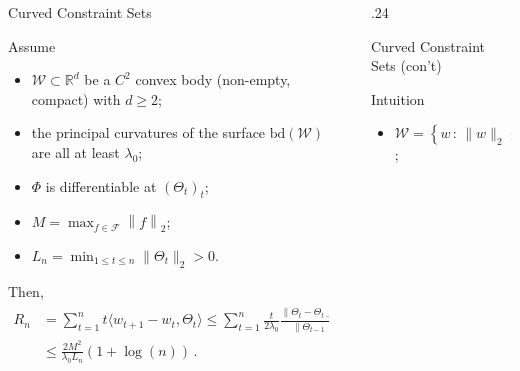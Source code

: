 \documentclass[final]{beamer} %
\newcommand{\cW}{\mathcal{W}}
\newcommand{\cF}{\mathcal{F}}
\newcommand{\bd}{\mathrm{bd}}
\newcommand{\R}{\mathbb{R}}
\newcommand{\norm}[1]{\left\| #1 \right\|}
\newcommand{\ip}[1]{\langle#1\rangle}
\newcommand{\set}[2]{\left\{#1 \,:\, #2 \right\}}
\begin{document}
\begin{frame}[c]
\begin{columns}[t,totalwidth=\textwidth]
\begin{column}{.24\textwidth}
\begin{block}{Curved Constraint Sets}
			\medskip
			\begin{tcolorbox}[title = \vspace{0.4cm}\textbf{\large Result I (Upper Bound)} \vspace{0.4cm}, title filled, width = 0.9\textwidth, colback = uofagreen!10, colframe = red, arc = 16pt]
				Assume
				\begin{itemize}
					\item $\cW\subset \R^d$ be a $C^2$ convex body (non-empty, compact) with $d \ge 2$;
					\item the principal curvatures of the surface $\bd(\cW)$ are all at least $\lambda_0$;
					\item $\Phi$ is differentiable at $(\Theta_t)_{t}$;
					\item $M = \max_{f\in \cF} \norm{f}_2$;
					\item  $L_n=\min_{1\le t \le n} \|\Theta_t\|_2 >0$. 
				\end{itemize}
					Then,
					\begin{align*}
					R_n & = \sum_{t=1}^{n} t\ip{ w_{t+1}-w_t,\Theta_t} %
					\le \sum_{t=1}^{n} \frac{t}{2\lambda_0} \frac{\|\Theta_t - \Theta_{t-1}\|_2^2}{\|\Theta_{t-1}\|_2} \\
					& \le \frac{2M^2}{\lambda_0 L_n}(1+ \log(n))\,.
					\end{align*}
			\end{tcolorbox}
		\end{block}
	\end{column}
	\begin{column}{0.01\textwidth}
	\end{column}
	\begin{column} {.24\textwidth}
		\begin{block}{Curved Constraint Sets (con't)}
			\vspace{-1cm}
			\noindent\begin{minipage}{0.95\textwidth}
				\begin{block}{Intuition}
						\vspace{-0.5cm}
						\begin{minipage}[b]{0.55\textwidth}
						\begin{itemize}
							\item $\cW = \set{w}{\|w\|_2\le 1}$;

\end{itemize}
\end{minipage}
\end{block}
\end{minipage}
\end{block}
\end{column}
\end{columns}
\end{frame}
\end{document}
